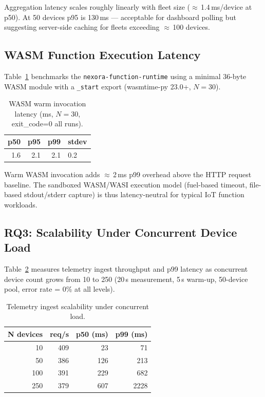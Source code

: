 \documentclass[twocolumn,smallextended]{svjour3}
\begin{document}
Aggregation latency scales roughly linearly with fleet size
($\approx$\,1.4\,ms/device at p50). At 50 devices p95 is 130\,ms —
acceptable for dashboard polling but suggesting server-side caching
for fleets exceeding $\approx$\,100 devices.

\subsection{WASM Function Execution Latency}
\label{sec:bench-wasm}

Table~\ref{tab:wasm} benchmarks the \texttt{nexora-function-runtime} using a minimal
36-byte WASM module with a \texttt{\_start} export (wasmtime-py 23.0+, $N\!=\!30$).

\begin{table}[t]
\centering
\caption{WASM warm invocation latency (ms, $N\!=\!30$, exit\_code=0 all runs).}
\label{tab:wasm}
\begin{tabular}{@{}rrrl@{}}
\toprule
p50 & p95 & p99 & stdev \\
\midrule
1.6 & 2.1 & 2.1 & 0.2 \\
\bottomrule
\end{tabular}
\end{table}

Warm WASM invocation adds $\approx$\,2\,ms p99 overhead above the HTTP request baseline.
The sandboxed WASM/WASI execution model (fuel-based timeout, file-based
stdout/stderr capture) is thus latency-neutral for typical IoT function workloads.

\subsection{RQ3: Scalability Under Concurrent Device Load}
\label{sec:bench-scale}

Table~\ref{tab:scale} measures telemetry ingest throughput and p99 latency
as concurrent device count grows from 10 to 250 (20\,s measurement, 5\,s
warm-up, 50-device pool, error rate = 0\% at all levels).

\begin{table}[t]
\centering
\caption{Telemetry ingest scalability under concurrent load.}
\label{tab:scale}
\begin{tabular}{@{}rrrr@{}}
\toprule
N devices & req/s & p50 (ms) & p99 (ms) \\
\midrule
10  & 409 & 23  & 71  \\
50  & 386 & 126 & 213 \\
100 & 391 & 229 & 682 \\
250 & 379 & 607 & 2228 \\
\bottomrule
\end{tabular}
\end{table}
\end{document}
